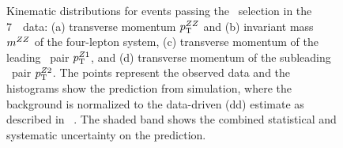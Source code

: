\begin{figure}[htbp]
\begin{center}
    \caption[Kinematic distributions for events passing the \ZZs\ selection in
    the 7~\tev\ data.]
    {Kinematic distributions for events passing the \ZZs\ selection in
    the 7~\tev\ data: (a) transverse momentum $p_{\mathrm{T}}^{ZZ}$ and (b) invariant mass $m^{ZZ}$ of the 
    four-lepton system, (c) transverse momentum of the leading
    \dilep\ pair $p_{\mathrm{T}}^{Z1}$, and (d) transverse momentum of the subleading
    \dilep\ pair $p_{\mathrm{T}}^{Z2}$. The points represent the observed data and the 
    histograms show the prediction from simulation, where the background
    is normalized to the data-driven (dd) estimate as described in
    ~. The shaded band 
    shows the combined statistical and systematic uncertainty on the prediction. 
    }
\end{center}
    \label{fig:zzdists-ZZs-seven}
\end{figure}


